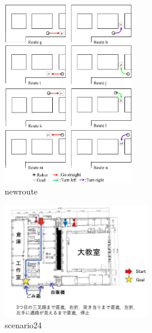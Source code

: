 \documentclass{sice-si}
\begin{document}
\begin{figure}[h!]
    \centering
     \includegraphics[height=80mm]{./figs/newroute.png}
     \caption{newroute}\label{fig:newroute}
\end{figure}

\begin{figure}[h!]
    \centering
     \includegraphics[height=50mm]{./figs/scenario24.png}
     \caption{scenario24}\label{fig:scenario24}
\end{figure}
\end{document}
